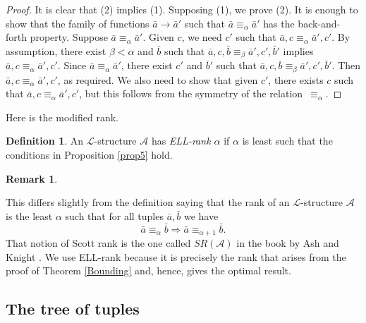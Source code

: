 \documentclass[10pt,a4paper]{article}
\newcommand{\ELL}{\textnormal{ELL}}
\theoremstyle{definition}
\newtheorem{defn}[thm]{Definition}
\newtheorem{remark}[thm]{Remark}
\begin{document}
	\begin{proof}
		
		It is clear that (2) implies (1). Supposing (1), we prove (2). It is enough to show that the family of functions $\bar{a}\rightarrow\bar{a}'$ such that $\bar{a}\equiv_\alpha\bar{a}'$ has the back-and-forth property. Suppose $\bar{a}\equiv_\alpha\bar{a}'$. Given $c$, we need $c'$ such that $\bar{a},c\equiv_\alpha \bar{a}',c'$. By assumption, there exist $\beta < \alpha$ and $\bar{b}$ such that $\bar{a},c,\bar{b}\equiv_\beta\bar{a}',c',\bar{b}'$ implies $\bar{a},c\equiv_\alpha\bar{a}',c'$. Since $\bar{a}\equiv_\alpha\bar{a}'$, there exist $c'$ and $\bar{b}'$ such that $\bar{a},c,\bar{b}\equiv_\beta\bar{a}',c',\bar{b}'$. Then $\bar{a},c\equiv_\alpha\bar{a}',c'$, as required. We also need to show that given $c'$, there exists $c$ such that $\bar{a},c\equiv_\alpha \bar{a}',c'$, but this follows from the symmetry of the relation~$\equiv_\alpha$.
	\end{proof}
	
	Here is the modified rank.
	
	\begin{defn}
		
		An $\mathcal{L}$-structure $\mathcal{A}$ has \emph{\ELL-rank $\alpha$} if $\alpha$ is least such that the conditions in Proposition \ref{prop5} hold. 
		
	\end{defn}
	
	\begin{remark}
		\label{rem:symm}
		
		This differs slightly from the definition saying that the rank of an $\mathcal{L}$-structure $\mathcal{A}$ is the least $\alpha$ such that for all tuples $\bar{a},\bar{b}$ we have
		\[ \bar{a}\equiv_\alpha \bar{b} \Longrightarrow \bar{a} \equiv_{\alpha + 1} \bar{b}.\]
		That notion of Scott rank is the one called $SR(\mathcal{A})$ in the book by Ash and Knight \cite{AK00}. We use \ELL-rank because it is precisely the rank that arises from the proof of Theorem \ref{Bounding} and, hence, gives the optimal result.
		
	\end{remark}
	
	\subsection{The tree of tuples}
	
\end{document}
